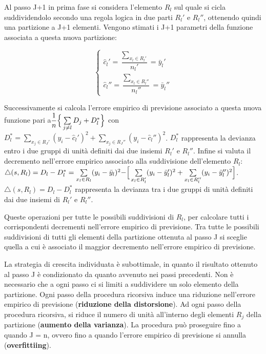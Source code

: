 \documentclass[a4paper]{extarticle}
\begin{document}
Al passo J+1 in prima fase si considera l'elemento $R_l$ sul quale si cicla suddividendolo secondo una regola logica in due parti $R_l'$ e $R_l ''$, ottenendo quindi una partizione a J+1 elementi. Vengono stimati i J+1 parametri della funzione associata a questa nuova partizione:

\begin{equation*}
\begin{cases}
		\hat c_l' = \dfrac{\sum\limits_{x_l \in R_l'}}{n_l'} = \bar y_l ' \\
		\hat c_l'' = \dfrac{\sum\limits_{x_l \in R_l''}}{n_l''} = \bar y_l '' 
	\end{cases}
\end{equation*}

Successivamente si calcola l'errore empirico di previsione associato a questa nuova funzione pari a$\dfrac{1}{n} \Bigr \{ \sum\limits_{j \not = l} D_j + D_l^* \Bigl \}$ con $D_l^* = \sum\limits_{x_j \in R_J'}(y_i - \hat c_l')^2 + \sum\limits_{x_j \in R_J''}(y_i - \hat c_l'')^2$. $D_l^*$ rappresenta la devianza entro i due gruppi di unità definiti dai due insiemi $R_l'$ e $R_l''$. Infine si valuta il decremento nell'errore empirico associato alla suddivisione dell'elemento $R_l$: $\triangle (s, R_l) = D_l - D_l^* = \sum\limits_{x_l \in R_l} (y_i- \bar y_l)^2 - \Bigr [ \sum\limits_{x_l \in R_l'} (y_i - \bar y_l')^2 + \sum\limits_{x_l \in R_l''} (y_i - \bar y_l'')^2 \Bigl ]$. $\triangle (s,R_l) = D_l -D_l^*$ rappresenta la devianza tra i due gruppi di unità definiti dai due insiemi di $R_l'$ e $R_l''$. 

Queste operazioni per tutte le possibili suddivisioni di $R_l$, per calcolare tutti i corrispondenti decrementi nell'errore empirico di previsione. Tra tutte le possibili suddivisioni di tutti gli elementi della partizione ottenuta al passo J si sceglie quella a cui è associato il maggior decremento nell'errore empirico di previsione.

La strategia di crescita individuata è subottimale, in quanto il risultato ottenuto al passo J è condizionato da quanto avvenuto nei passi precedenti. Non è necessario che a ogni passo ci si limiti a suddividere un solo elemento della partizione. Ogni passo della procedura ricorsiva induce una riduzione nell'errore empirico di previsione (\textbf{riduzione della distorsione}). Ad ogni passo della procedura ricorsiva, si riduce il numero di unità all'interno degli elementi $R_j$ della partizione (\textbf{aumento della varianza}). La procedura può proseguire fino a quando J = n, ovvero fino a quando l'errore empirico di previsione si annulla (\textbf{overfittiing}).
\end{document}
